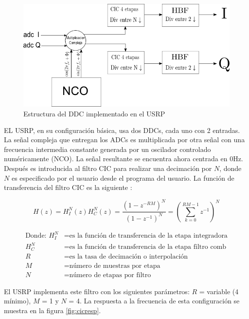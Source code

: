 \begin{figure}[htp]
\centering
	\includegraphics[width=5.5in]{figs/ddc}
	\vspace{0.3in}
	\caption{Estructura del DDC implementado en el USRP}
	\label{fig:ddcblock}
\end{figure}

EL USRP, en su configuraci\'on b\'asica, usa dos DDCs, cada uno con 2
entradas. La se\~nal compleja que entregan los ADCs es multiplicada por otra se\~nal con una
frecuencia intermedia constante generada por un oscilador controlado num\'ericamente (NCO).  La
se\~nal resultante se encuentra ahora centrada en 0Hz. Despu\'es es introducida al filtro CIC para
realizar una decimaci\'on por $N$, donde $N$ es especificado por el usuario desde el programa
del usuario. La funci\'on de transferencia del filtro CIC es la siguiente
\cite{cic}:

\begin{equation}
H(z)=H_I^N(z)H_C^N(z)=\frac{(1-z^{-RM})^N}{(1-z^{-1})^N}=\left(\sum_{k=0}^{RM-1}z^{-1}\right)^N
\end{equation}

\begin{equation*}
\begin{aligned}
\text{Donde: }H_I^N&=\text{es la funci\'on de transferencia de la etapa
integradora}\\
H_C^N&=\text{es la funci\'on de transferencia de la etapa filtro comb}\\
R&=\text{es la tasa de decimaci\'on o interpolaci\'on}\\
M&=\text{n\'umero de muestras por etapa}\\
N&=\text{n\'umero de etapas por filtro}
\end{aligned}
\end{equation*}

El USRP implementa este filtro con los siguientes par\'ametros: $R$ = variable (4 m\'inimo), $M$ = 1
y $N$ = 4. La respuesta a la frecuencia de esta configuraci\'on se muestra en la figura
\ref{fig:cicresp}.

